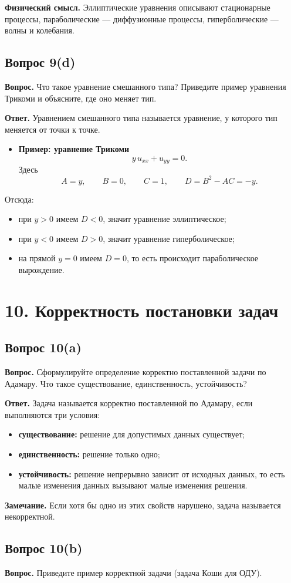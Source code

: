 \documentclass[a4paper,12pt]{article}
\newcommand{\Question}[2]{\subsection*{Вопрос #1}\textbf{Вопрос.} #2}
\newcommand{\Answer}{\textbf{Ответ.}}
\begin{document}
\textbf{Физический смысл.} Эллиптические уравнения описывают стационарные процессы, параболические --- диффузионные процессы, гиперболические --- волны и колебания.

\Question{9(d)}{Что такое уравнение смешанного типа? Приведите пример уравнения Трикоми и объясните, где оно меняет тип.}

\Answer
Уравнением смешанного типа называется уравнение, у которого тип меняется от точки к точке.

\begin{itemize}
  \item \textbf{Пример: уравнение Трикоми}
  \[
  y\,u_{xx}+u_{yy}=0.
  \]
  Здесь
  \[
  A=y, \qquad B=0, \qquad C=1,
  \qquad
  D=B^2-AC=-y.
  \]
\end{itemize}

Отсюда:
\begin{itemize}
  \item при $y>0$ имеем $D<0$, значит уравнение эллиптическое;
  \item при $y<0$ имеем $D>0$, значит уравнение гиперболическое;
  \item на прямой $y=0$ имеем $D=0$, то есть происходит параболическое вырождение.
\end{itemize}

\section*{10. Корректность постановки задач}

\Question{10(a)}{Сформулируйте определение корректно поставленной задачи по Адамару. Что такое существование, единственность, устойчивость?}

\Answer
Задача называется корректно поставленной по Адамару, если выполняются три условия:

\begin{itemize}
  \item \textbf{существование:} решение для допустимых данных существует;
  \item \textbf{единственность:} решение только одно;
  \item \textbf{устойчивость:} решение непрерывно зависит от исходных данных, то есть малые изменения данных вызывают малые изменения решения.
\end{itemize}

\textbf{Замечание.} Если хотя бы одно из этих свойств нарушено, задача называется некорректной.

\Question{10(b)}{Приведите пример корректной задачи (задача Коши для ОДУ).}
\end{document}
